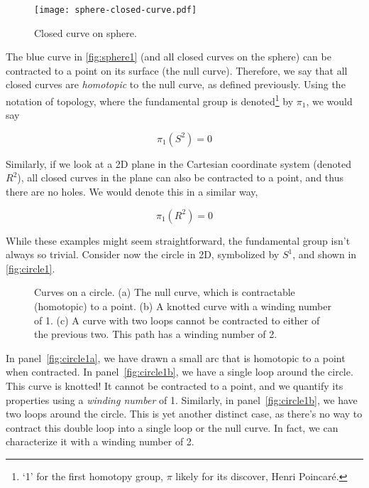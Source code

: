 \documentclass[12pt, english]{book}
\begin{document}
\begin{figure}[!ht]
	\centering 
	\texttt{[image: sphere-closed-curve.pdf]}
	\caption{Closed curve on sphere.}
	\label{fig:sphere1}
\end{figure}

The blue curve in \autoref{fig:sphere1} (and all closed curves on the sphere) can be contracted to a point on its surface (the null curve).
Therefore, we say that all closed curves are \emph{homotopic} to the null curve, as defined previously.
Using the notation of topology, where the fundamental group is denoted\footnote{`1' for the first homotopy group, $\pi$ likely for its discover, Henri Poincar{\'e}.} by $\pi_1$, we would say 

\begin{equation*}
	\pi_1(S^2) = 0
\end{equation*}

Similarly, if we look at a 2D plane in the Cartesian coordinate system (denoted $R^2$), all closed curves in the plane can also be contracted to a point, and thus there are no holes.
We would denote this in a similar way, 

\begin{equation*}
	\pi_1(R^2) = 0
\end{equation*}

While these examples might seem straightforward, the fundamental group isn't always so trivial.
Consider now the circle in 2D, symbolized by $S^1$, and shown in \autoref{fig:circle1}.

\begin{figure}[!ht]
	\centering 
	 \hfill
	 \hfill
	\caption{Curves on a circle.
	(a) The null curve, which is contractable (homotopic) to a point.
	(b) A knotted curve with a winding number of 1.
	(c) A curve with two loops cannot be contracted to either of the previous two. 
	This path has a winding number of 2.}
	\label{fig:circle1}
\end{figure}

In panel~\ref{fig:circle1a}, we have drawn a small arc that is homotopic to a point when contracted. 
In panel~\ref{fig:circle1b}, we have a single loop around the circle.
This curve is knotted! 
It cannot be contracted to a point, and we quantify its properties using a \emph{winding number} of 1.
Similarly, in panel~\ref{fig:circle1b}, we have two loops around the circle.
This is yet another distinct case, as there's no way to contract this double loop into a single loop or the null curve. 
In fact, we can characterize it with a winding number of 2.
\end{document}
